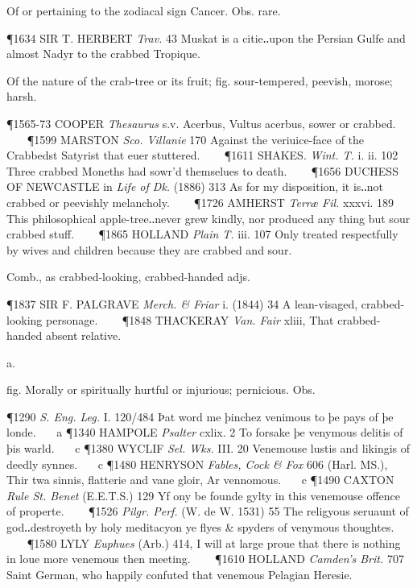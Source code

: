 \begin{description}[wide, labelwidth=!, labelindent=0pt]
\begin{myenumerate}
 Of or pertaining to the zodiacal sign Cancer. Obs. rare.

\P 1634 SIR T. HERBERT  \textit{Trav.} 43 Muskat is a citie‥upon the Persian Gulfe and almost Nadyr to the crabbed Tropique.

 Of the nature of the crab-tree or its fruit; fig. sour-tempered, peevish, morose; harsh.

\P 1565-73 COOPER  \textit{Thesaurus} s.v. Acerbus, Vultus acerbus, sower or crabbed.    
\P 1599 MARSTON  \textit{Sco. Villanie} 170 Against the veriuice-face of the Crabbedst Satyrist that euer stuttered.    
\P 1611 SHAKES.  \textit{Wint. T.} i. ii. 102 Three crabbed Moneths had sowr'd themselues to death.    
\P 1656 DUCHESS  OF NEWCASTLE in \textit{Life of Dk.} (1886) 313 As for my disposition, it is‥not crabbed or peevishly melancholy.    
\P 1726 AMHERST  \textit{Terræ Fil.} xxxvi. 189 This philosophical apple-tree‥never grew kindly, nor produced any thing but sour crabbed stuff.    
\P 1865 HOLLAND  \textit{Plain T.} iii. 107 Only treated respectfully by wives and children because they are crabbed and sour.

 Comb., as crabbed-looking, crabbed-handed adjs.

\P 1837 SIR F. PALGRAVE  \textit{Merch. \& Friar} i. (1844) 34 A lean-visaged, crabbed-looking personage.    
\P 1848 THACKERAY  \textit{Van. Fair} xliii, That crabbed-handed absent relative.
\end{myenumerate}


 a.

\noindent {}

\noindent [a. AF. venimus, venimous, = OF. (also mod.F.) venimeux, f. venim venom n., after L. venēnōsus: see venenous a.]
\vspace{-0.3cm}

\begin{myenumerate}

 fig. Morally or spiritually hurtful or injurious; pernicious. Obs.

\P 1290 \textit{S. Eng.  Leg.} I. 120/484 Þat word me þinchez venimous to þe pays of þe londe.    a 
\P 1340 HAMPOLE  \textit{Psalter} cxlix. 2 To forsake þe venymous delitis of þis warld.    c 
\P 1380 WYCLIF  \textit{Sel. Wks.} III. 20 Venemouse lustis and likingis of deedly synnes.    c 
\P 1480 HENRYSON  \textit{Fables, Cock \& Fox} 606 (Harl. MS.), Thir twa sinnis, flatterie and vane gloir, Ar vennomous.    c 
\P 1490 CAXTON  \textit{Rule St. Benet} (E.E.T.S.) 129 Yf ony be founde gylty in this venemouse offence of properte.    
\P 1526  \textit{Pilgr. Perf.} (W. de W. 1531) 55 The religyous seruaunt of god‥destroyeth by holy meditacyon ye flyes \& spyders of venymous thoughtes.    
\P 1580 LYLY  \textit{Euphues} (Arb.) 414, I will at large proue that there is nothing in loue more venemous then meeting.    
\P 1610 HOLLAND  \textit{Camden's Brit.} 707 Saint German, who happily confuted that venemous Pelagian Heresie.


\end{myenumerate}
\end{description}
